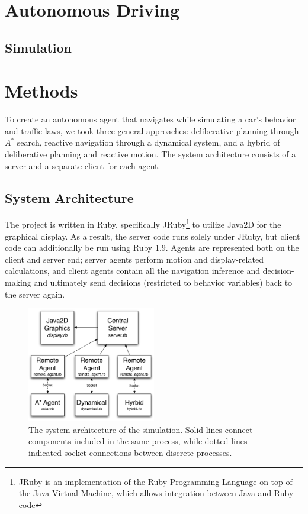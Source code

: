 \documentclass{article}
\begin{document}
\section{Autonomous Driving}

\subsection{Simulation}

\section{Methods}

To create an autonomous agent that navigates while simulating a car's behavior
and traffic laws, we took three general approaches: deliberative planning
through $A^*$ search, reactive navigation through a dynamical system, and a
hybrid of deliberative planning and reactive motion. The system architecture
consists of a server and a separate client for each agent.

\subsection{System Architecture}

The project is written in Ruby, specifically JRuby\footnote{JRuby is an
  implementation of the Ruby Programming Language on top of the Java Virtual
  Machine, which allows integration between Java and Ruby code} to utilize
Java2D for the graphical display. As a result, the server code runs solely under
JRuby, but client code can additionally be run using Ruby 1.9. Agents are
represented both on the client and server end; server agents perform motion and
display-related calculations, and client agents contain all the navigation
inference and decision-making and ultimately send decisions (restricted to
behavior variables) back to the server again.

\begin{figure}[h]
  \begin{center}
    \includegraphics[width=0.5\textwidth]{architecture}
  \end{center}
  \caption{The system architecture of the simulation. Solid lines connect
    components included in the same process, while dotted lines indicated socket
    connections between discrete processes.}
  \label{architecture}
\end{figure}
\end{document}
